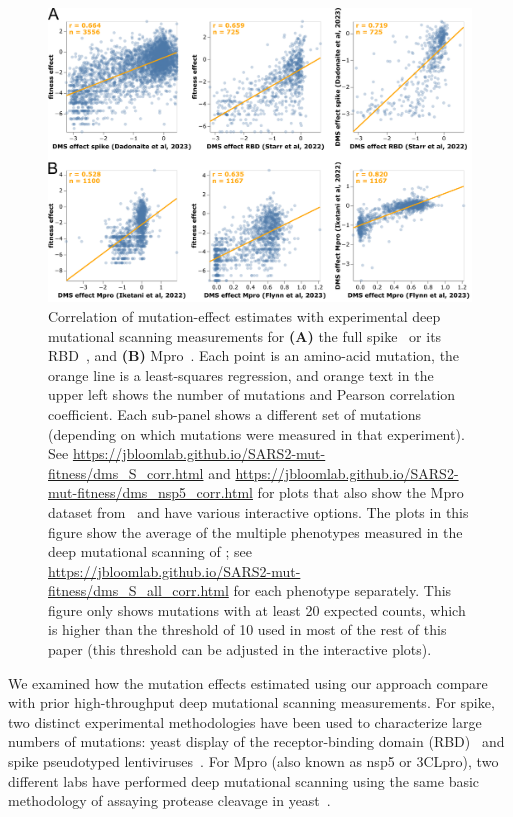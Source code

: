 \documentclass[9pt,twocolumn,twoside]{gsajnl_modified}
\begin{document}
\begin{figure}
\centering
\includegraphics[width=0.7\linewidth]{figs/dms.png}
\caption{
Correlation of mutation-effect estimates with experimental deep mutational scanning measurements for {\bf (A)} the full spike~\citep{dadonaite2023pseudovirus} or its RBD~\citep{starr2022deep}, and {\bf (B)} Mpro~\citep{flynn2023,iketani2022functional}.
Each point is an amino-acid mutation, the orange line is a least-squares regression, and orange text in the upper left shows the number of mutations and Pearson correlation coefficient.
Each sub-panel shows a different set of mutations (depending on which mutations were measured in that experiment).
See \url{https://jbloomlab.github.io/SARS2-mut-fitness/dms_S_corr.html} and \url{https://jbloomlab.github.io/SARS2-mut-fitness/dms_nsp5_corr.html} for plots that also show the Mpro dataset from~\citep{flynn2022} and have various interactive options.
The plots in this figure show the average of the multiple phenotypes measured in the deep mutational scanning of \cite{starr2022deep}; see \url{https://jbloomlab.github.io/SARS2-mut-fitness/dms_S_all_corr.html} for each phenotype separately.
This figure only shows mutations with at least 20 expected counts, which is higher than the threshold of 10 used in most of the rest of this paper (this threshold can be adjusted in the interactive plots).
\label{fig:dms}
}
\end{figure}

We examined how the mutation effects estimated using our approach compare with prior high-throughput deep mutational scanning measurements.
For spike, two distinct experimental methodologies have been used to characterize large numbers of mutations: yeast display of the receptor-binding domain (RBD)~\citep{starr2020deep,starr2022deep} and spike pseudotyped lentiviruses~\citep{dadonaite2023pseudovirus}.
For Mpro (also known as nsp5 or 3CLpro), two different labs have performed deep mutational scanning using the same basic methodology of assaying protease cleavage in yeast~\citep{flynn2022,flynn2023,iketani2022functional}.
\end{document}
